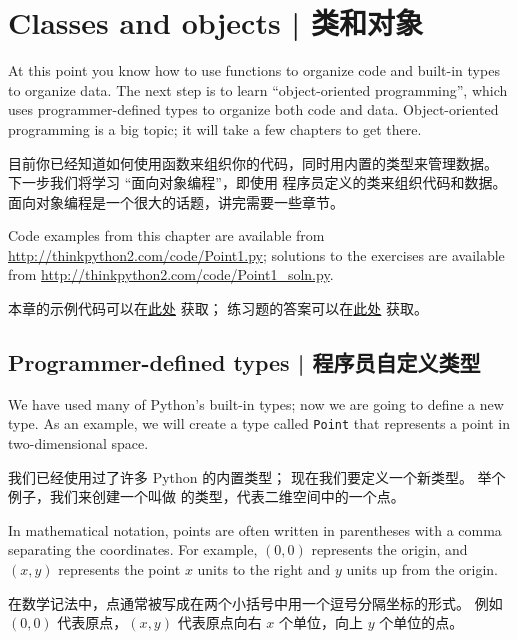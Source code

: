 

\chapter{Classes and objects  |  类和对象}
\label{clobjects}

At this point you know how to use
functions to organize code and
built-in types to organize data.  The next step is to learn
``object-oriented programming'', which uses programmer-defined types
to organize both code and data.  Object-oriented programming is
a big topic; it will take a few chapters to get there.

目前你已经知道如何使用函数来组织你的代码，同时用内置的类型来管理数据。
下一步我们将学习 ``面向对象编程''，即使用
程序员定义的类来组织代码和数据。
面向对象编程是一个很大的话题，讲完需要一些章节。


Code examples from this chapter are available from
\url{http://thinkpython2.com/code/Point1.py}; solutions
to the exercises are available from
\url{http://thinkpython2.com/code/Point1_soln.py}.

本章的示例代码可以在\href{http://thinkpython2.com/code/Point1.py}{此处} 获取；
练习题的答案可以在\href{http://thinkpython2.com/code/Point1_soln.py}{此处} 获取。


\section{Programmer-defined types  |  程序员自定义类型}
\label{point}
  

We have used many of Python's built-in types; now we are going
to define a new type.  As an example, we will create a type
called {\tt Point} that represents a point in two-dimensional
space.

我们已经使用过了许多 Python 的内置类型；
现在我们要定义一个新类型。 举个例子，我们来创建一个叫做  的类型，代表二维空间中的一个点。


In mathematical notation, points are often written in
parentheses with a comma separating the coordinates. For example,
$(0,0)$ represents the origin, and $(x,y)$ represents the
point $x$ units to the right and $y$ units up from the origin.

在数学记法中，点通常被写成在两个小括号中用一个逗号分隔坐标的形式。
例如 $(0,0)$ 代表原点，$(x,y)$ 代表原点向右 $x$ 个单位，向上 $y$ 个单位的点。

